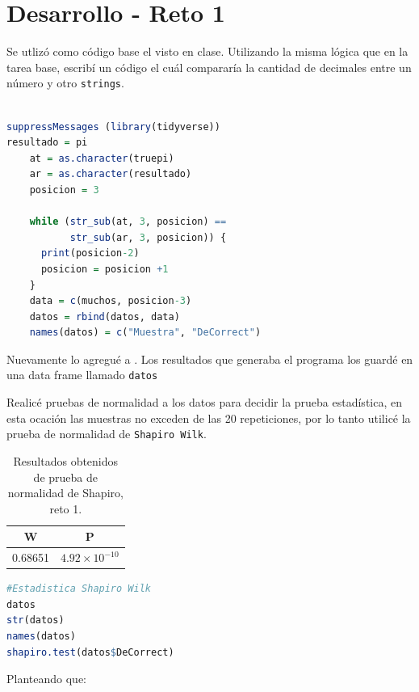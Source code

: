 \documentclass{article}
\begin{document}
\section{Desarrollo - Reto 1}\label{desarrollo} %

Se utliz\'o como c\'odigo base el visto en clase\cite{Cbaser1}. 
Utilizando la misma l\'ogica que en la tarea base, escrib\'i un c\'odigo  el cu\'al comparar\'ia la cantidad de decimales entre un n\'umero y otro \texttt{strings}.


\begin{lstlisting}[language=R, caption= C\'odigo para comparar n\'umeros como strings.]

suppressMessages (library(tidyverse))
resultado = pi
    at = as.character(truepi)
    ar = as.character(resultado)
    posicion = 3
    
    while (str_sub(at, 3, posicion) ==
           str_sub(ar, 3, posicion)) {
      print(posicion-2)
      posicion = posicion +1
    }
    data = c(muchos, posicion-3)
    datos = rbind(datos, data)
    names(datos) = c("Muestra", "DeCorrect")
\end{lstlisting}

Nuevamente lo agregu\'e a \cite{Cbaser1}. Los resultados que generaba el programa los guard\'e en una data frame llamado \texttt{datos}

Realic\'e pruebas de normalidad a los datos para decidir la prueba estad\'istica, en esta ocaci\'on las muestras no exceden de las 20 repeticiones, por lo tanto utilic\'e la prueba de normalidad de \texttt{Shapiro Wilk}.

\begin{table}[ht]
    \centering
    \caption{Resultados obtenidos de prueba de normalidad de Shapiro, reto 1.} 
    \begin{tabular}{|c|c|}
    \hline
    W & P  \\
    \hline
    0.68651 & $4.92\times 10^{-10}$ \\
    \hline 
\end{tabular}
    \label{cuadro 4}
\end{table}

\begin{lstlisting}[language=R, caption= C\'odigo prueba de normalidad Shapiro-Wilk.]
#Estadistica Shapiro Wilk
datos
str(datos)
names(datos)
shapiro.test(datos$DeCorrect)
\end{lstlisting}

Planteando que:
\end{document}
